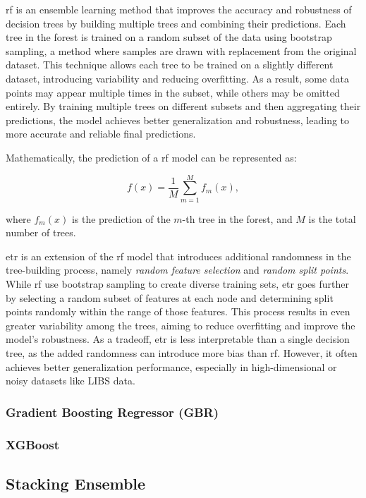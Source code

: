 \gls{rf} is an ensemble learning method that improves the accuracy and robustness of decision trees by building multiple trees and combining their predictions.
Each tree in the forest is trained on a random subset of the data using bootstrap sampling, a method where samples are drawn with replacement from the original dataset.
This technique allows each tree to be trained on a slightly different dataset, introducing variability and reducing overfitting.
As a result, some data points may appear multiple times in the subset, while others may be omitted entirely.
By training multiple trees on different subsets and then aggregating their predictions, the model achieves better generalization and robustness, leading to more accurate and reliable final predictions.

Mathematically, the prediction of a \gls{rf} model can be represented as:

$$
f(x) = \frac{1}{M} \sum_{m=1}^{M} f_m(x),
$$

where $f_m(x)$ is the prediction of the $m$-th tree in the forest, and $M$ is the total number of trees.

\gls{etr} is an extension of the \gls{rf} model that introduces additional randomness in the tree-building process, namely \textit{random feature selection} and \textit{random split points}.
While \gls{rf} use bootstrap sampling to create diverse training sets, \gls{etr} goes further by selecting a random subset of features at each node and determining split points randomly within the range of those features.
This process results in even greater variability among the trees, aiming to reduce overfitting and improve the model's robustness.
As a tradeoff, \gls{etr} is less interpretable than a single decision tree, as the added randomness can introduce more bias than \gls{rf}.
However, it often achieves better generalization performance, especially in high-dimensional or noisy datasets like LIBS data.

\subsubsection{Gradient Boosting Regressor (GBR)}

\subsubsection{XGBoost}

\subsection{Stacking Ensemble}
